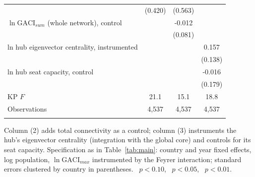 \begin{table}[p]
\begin{threeparttable}
\begin{tabular}{lccc}
 & (0.420) & (0.563) &  \\
$\ln\mathrm{GACI}_{sum}$ (whole network), control &  & -0.012 &  \\
 &  & (0.081) &  \\
ln hub eigenvector centrality, instrumented &  &  & 0.157 \\
 &  &  & (0.138) \\
ln hub seat capacity, control &  &  & -0.016 \\
 &  &  & (0.179) \\
KP $F$ & 21.1 & 15.1 & 18.8 \\
Observations & 4{,}537 & 4{,}537 & 4{,}537 \\
\addlinespace
\bottomrule
\end{tabular}
\begin{tablenotes}\small
\item Column (2) adds total connectivity as a control; column (3) instruments the hub's eigenvector centrality (integration with the global core) and controls for its seat capacity. Specification as in Table~\ref{tab:main}: country and year fixed effects, log population, $\ln\mathrm{GACI}_{max}$ instrumented by the Feyrer interaction; standard errors clustered by country in parentheses. \sym{*}~$p<0.10$, \sym{**}~$p<0.05$, \sym{***}~$p<0.01$.
\end{tablenotes}
\end{threeparttable}
\end{table}
